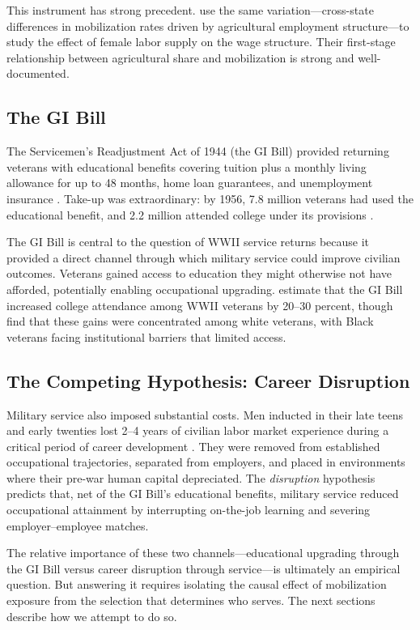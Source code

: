 \documentclass[12pt]{article}
\begin{document}
This instrument has strong precedent. \citet{acemoglu2004} use the same variation---cross-state differences in mobilization rates driven by agricultural employment structure---to study the effect of female labor supply on the wage structure. Their first-stage relationship between agricultural share and mobilization is strong and well-documented.

\subsection{The GI Bill}

The Servicemen's Readjustment Act of 1944 (the GI Bill) provided returning veterans with educational benefits covering tuition plus a monthly living allowance for up to 48 months, home loan guarantees, and unemployment insurance \citep{mettler2005}. Take-up was extraordinary: by 1956, 7.8 million veterans had used the educational benefit, and 2.2 million attended college under its provisions \citep{boundturner2002}.

The GI Bill is central to the question of WWII service returns because it provided a direct channel through which military service could improve civilian outcomes. Veterans gained access to education they might otherwise not have afforded, potentially enabling occupational upgrading. \citet{boundturner2002} estimate that the GI Bill increased college attendance among WWII veterans by 20--30 percent, though \citet{turnerbound2003} find that these gains were concentrated among white veterans, with Black veterans facing institutional barriers that limited access.

\subsection{The Competing Hypothesis: Career Disruption}

Military service also imposed substantial costs. Men inducted in their late teens and early twenties lost 2--4 years of civilian labor market experience during a critical period of career development \citep{angristkrueger1994}. They were removed from established occupational trajectories, separated from employers, and placed in environments where their pre-war human capital depreciated. The \textit{disruption} hypothesis predicts that, net of the GI Bill's educational benefits, military service reduced occupational attainment by interrupting on-the-job learning and severing employer--employee matches.

The relative importance of these two channels---educational upgrading through the GI Bill versus career disruption through service---is ultimately an empirical question. But answering it requires isolating the causal effect of mobilization exposure from the selection that determines who serves. The next sections describe how we attempt to do so.
\end{document}
